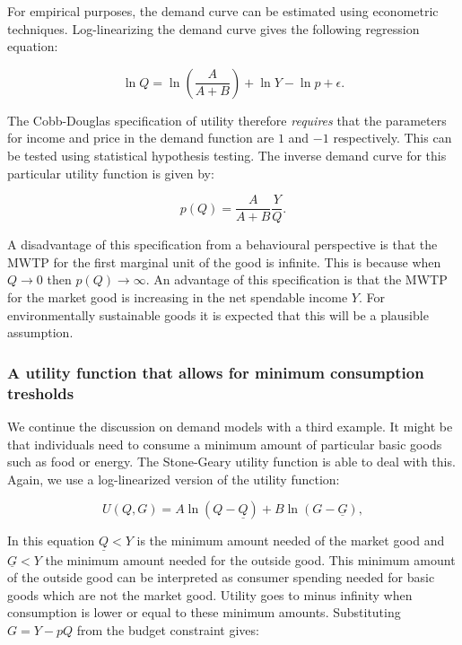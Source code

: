 \documentclass[
]{book}
\begin{document}
For empirical purposes, the demand curve can be estimated using econometric techniques. Log-linearizing the demand curve gives the following regression equation:

\begin{equation}
\ln Q = \ln(\frac{A}{A+B}) + \ln Y - \ln p + \epsilon.
\end{equation}

The Cobb-Douglas specification of utility therefore \emph{requires} that the parameters for income and price in the demand function are \(1\) and \(-1\) respectively. This can be tested using statistical hypothesis testing. The inverse demand curve for this particular utility function is given by:

\begin{equation}
p(Q) = \frac{A}{A + B}\frac{Y}{Q}.
\end{equation}

A disadvantage of this specification from a behavioural perspective is that the MWTP for the first marginal unit of the good is infinite. This is because when \(Q \longrightarrow 0\) then \(p(Q) \longrightarrow \infty\). An advantage of this specification is that the MWTP for the market good is increasing in the net spendable income \(Y\). For environmentally sustainable goods it is expected that this will be a plausible assumption.

\hypertarget{a-utility-function-that-allows-for-minimum-consumption-tresholds}{%
\subsubsection{A utility function that allows for minimum consumption tresholds}\label{a-utility-function-that-allows-for-minimum-consumption-tresholds}}

We continue the discussion on demand models with a third example. It might be that individuals need to consume a minimum amount of particular basic goods such as food or energy. The Stone-Geary utility function is able to deal with this. Again, we use a log-linearized version of the utility function:

\begin{equation}
U(Q,G) = A \ln (Q - \underline{Q}) + B \ln (G - \underline{G}),
\end{equation}

In this equation \(\underline{Q} <Y\) is the minimum amount needed of the market good and \(\underline{G}<Y\) the minimum amount needed for the outside good. This minimum amount of the outside good can be interpreted as consumer spending needed for basic goods which are not the market good. Utility goes to minus infinity when consumption is lower or equal to these minimum amounts. Substituting \(G=Y-pQ\) from the budget constraint gives:
\end{document}
